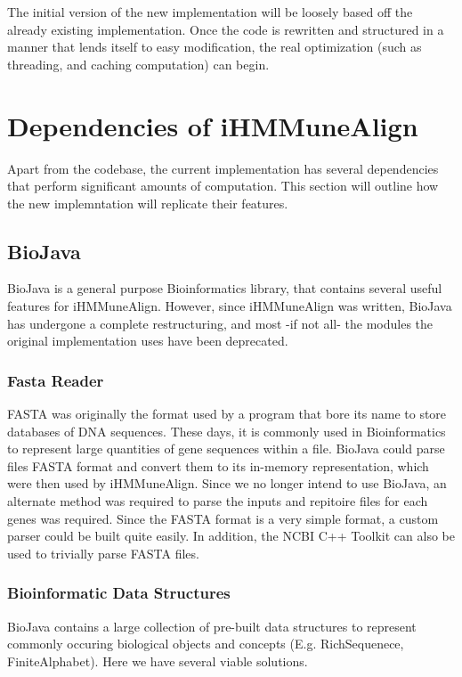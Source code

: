 \documentclass[a4paper,12pt]{report}
\begin{document}
The initial version of the new implementation will be loosely based off the already existing implementation. Once the code is rewritten and structured in a manner that lends itself to easy modification, the real optimization (such as threading, and caching computation) can begin.

\section{Dependencies of iHMMuneAlign}
Apart from the codebase, the current implementation has several dependencies that perform significant amounts of computation. This section will outline how the new implemntation will replicate their features.

\subsection{BioJava}
BioJava \autocite{biojava}is a general purpose Bioinformatics library, that contains several useful features for iHMMuneAlign. However, since iHMMuneAlign was written, BioJava has undergone a complete restructuring, and most -if not all- the modules the original implementation uses have been deprecated. 

\subsubsection{Fasta Reader}
FASTA was originally the format used by a program that bore its name to store databases of DNA sequences\autocite{fasta}. These days, it is commonly used in Bioinformatics to represent large quantities of gene sequences within a file. BioJava could parse files FASTA format and convert them to its in-memory representation, which were then used by iHMMuneAlign. 
Since we no longer intend to use BioJava, an alternate method was required to parse the inputs and repitoire files for each genes was required. Since the FASTA format is a very simple format, a custom parser could be built quite easily. In addition, the NCBI C++ Toolkit \autocite{ncbi-fasta} can also be used to trivially parse FASTA files.

\subsubsection{Bioinformatic Data Structures}
BioJava contains a large collection of pre-built data structures to represent commonly occuring biological objects and concepts (E.g. RichSequenece, FiniteAlphabet). Here we have several viable solutions.
\end{document}
